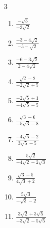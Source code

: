 \begin{multicols}{3}
\begin{enumerate}
  \item $\displaystyle \frac{-\sqrt{3}}{-3\sqrt{2}}$


  \item $\displaystyle \frac{-3-4\sqrt{2}}{-5-\sqrt{2}}$


  \item $\displaystyle \frac{-6-3\sqrt{2}}{2-4\sqrt{2}}$


  \item $\displaystyle \frac{\sqrt{2}-2}{-2\sqrt{2}+5}$


  \item $\displaystyle \frac{-2\sqrt{5}+1}{-4\sqrt{5}-5}$


\columnbreak %

  \item $\displaystyle \frac{\sqrt{3}-6}{-5\sqrt{3}-8}$


  \item $\displaystyle \frac{-4\sqrt{5}-2}{3\sqrt{5}-5}$


  \item $\displaystyle \frac{5\sqrt{2}}{-4\sqrt{2}-2\sqrt{3}}$


  \item $\displaystyle \frac{\sqrt{3}-5}{4\sqrt{3}+2}$


  \item $\displaystyle \frac{5\sqrt{3}}{-\sqrt{3}-2}$


\columnbreak %

  \item $\displaystyle \frac{3\sqrt{2}+3\sqrt{5}}{-3\sqrt{2}-5\sqrt{5}}$


\end{enumerate}
\end{multicols}
